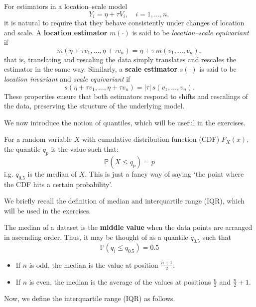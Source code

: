 \begin{remark}
For estimators in a location–scale model 
\[
Y_i = \eta + \tau V_i, \quad i=1,\dots,n,
\]
it is natural to require that they behave consistently under changes of location and scale. 
A \textbf{location estimator} $m(\cdot)$ is said to be \emph{location–scale equivariant} if
\[
m(\eta + \tau v_1, \ldots, \eta + \tau v_n) = \eta + \tau\, m(v_1, \ldots, v_n),
\]
that is, translating and rescaling the data simply translates and rescales the estimator in the same way. Similarly, a \textbf{scale estimator} $s(\cdot)$ is said to be \emph{location invariant} and \emph{scale equivariant} if
\[
s(\eta + \tau v_1, \ldots, \eta + \tau v_n) = |\tau|\, s(v_1, \ldots, v_n).
\]
These properties ensure that both estimators respond to shifts and rescalings of the data, preserving the structure of the underlying model.
\end{remark}

\vspace{0.2cm}

We now introduce the notion of quantiles, which will be useful in the exercises.
\begin{definition}[Quantiles]
    For a random variable $X$ with cumulative distribution function (CDF) $F_X(x)$, the quantile $q_p$ is the value such that:
    $$\mathbb{P}(X \leq q_p) = p$$
    i.g. $q_{0.5}$ is the median of $X$. This is just a fancy way of saying `the point where the CDF hits a certain probability'.    
\end{definition}

\vspace{0.2cm}

We briefly recall the definition of median and interquartile range (IQR), which will be used in the exercises.
\begin{definition}[Median]
The median of a dataset is the \textbf{middle value} when the data points are arranged in ascending order. Thus, it may be thought of as a quantile $q_{0.5}$ such
that
$$\mathbb{P}(q_i \leq q_{0.5}) = 0.5$$
\begin{itemize}
    \item If $n$ is odd, the median is the value at position $\frac{n+1}{2}$.
    \item If $n$ is even, the median is the average of the values at positions $\frac{n}{2}$ and $\frac{n}{2} + 1$.
\end{itemize} 
\end{definition}

Now, we define the interquartile range (IQR) as follows.

